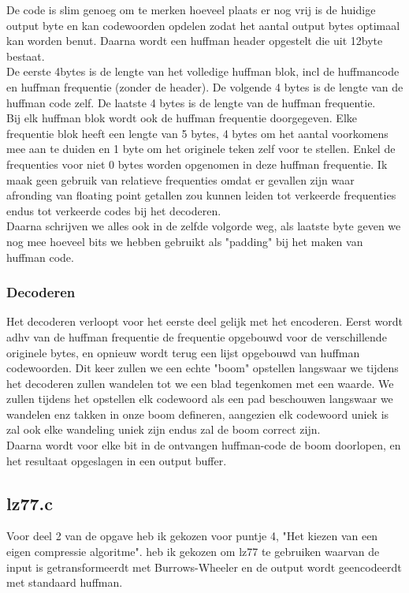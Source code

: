 \documentclass[10pt,a4paper]{report}
\begin{document}
De code is slim genoeg om te merken hoeveel plaats er nog vrij is de huidige output byte en kan codewoorden opdelen zodat het aantal output bytes optimaal kan worden benut.
Daarna wordt een huffman header opgestelt die uit 12byte bestaat.\\
De eerste 4bytes is de lengte van het volledige huffman blok, incl de huffmancode en huffman frequentie  (zonder de header). 
De volgende 4 bytes is de lengte van de huffman code zelf. De laatste 4 bytes is de lengte van de huffman frequentie.\\

Bij elk huffman blok wordt ook de huffman frequentie doorgegeven. Elke frequentie blok heeft een lengte van 5 bytes, 4 bytes om het aantal voorkomens mee aan te duiden en 1 byte om het originele teken zelf voor te stellen. Enkel de frequenties voor niet 0 bytes worden opgenomen in deze huffman frequentie. Ik maak geen gebruik van relatieve frequenties omdat er gevallen zijn waar afronding van floating point getallen zou kunnen leiden tot verkeerde frequenties endus tot verkeerde codes bij het decoderen.\\
Daarna schrijven we alles ook in de zelfde volgorde weg, als laatste byte geven we nog mee hoeveel bits we hebben gebruikt als "padding" bij het maken van huffman code.
\subsubsection*{Decoderen}
Het decoderen verloopt voor het eerste deel gelijk met het encoderen. Eerst wordt adhv van de huffman frequentie de frequentie opgebouwd voor de verschillende originele bytes, en opnieuw wordt terug een lijst opgebouwd van huffman codewoorden. Dit keer zullen we een echte "boom" opstellen langswaar we tijdens het decoderen zullen wandelen tot we een blad tegenkomen met een waarde. We zullen tijdens het opstellen elk codewoord als een pad beschouwen langswaar we wandelen enz takken in onze boom defineren, aangezien elk codewoord uniek is zal ook elke wandeling uniek zijn endus zal de boom correct zijn.\\

Daarna wordt voor elke bit in de ontvangen huffman-code de boom doorlopen, en het resultaat opgeslagen in een output buffer. 
\subsection*{lz77.c}
Voor deel 2 van de opgave heb ik gekozen voor puntje 4, "Het kiezen van een eigen compressie algoritme". heb ik gekozen om lz77 te gebruiken waarvan de input is getransformeerdt met Burrows-Wheeler en de output wordt geencodeerdt met standaard huffman. \\
\end{document}
